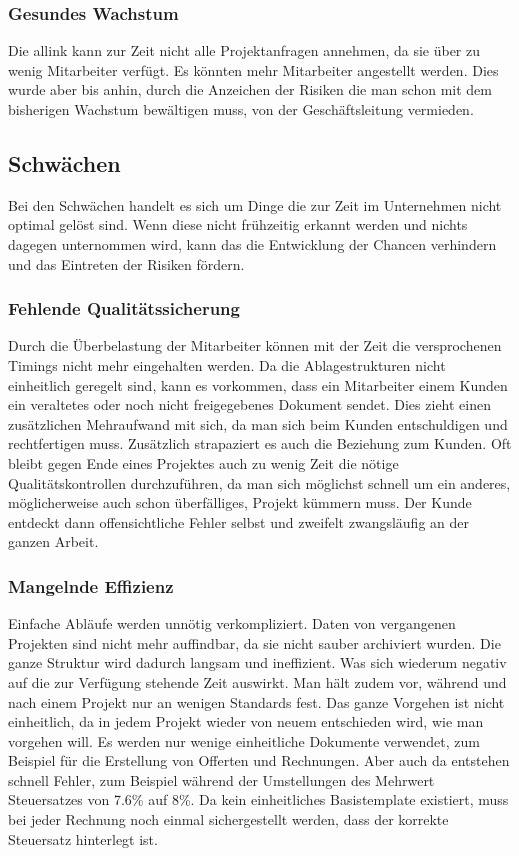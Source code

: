 \subsubsection{Gesundes Wachstum}
Die allink kann zur Zeit nicht alle Projektanfragen annehmen, da sie über zu
wenig Mitarbeiter verfügt. Es könnten mehr Mitarbeiter angestellt werden. Dies
wurde aber bis anhin, durch die Anzeichen der Risiken die man schon mit dem bisherigen
Wachstum bewältigen muss, von der Geschäftsleitung vermieden.

\subsection{Schwächen}
Bei den Schwächen handelt es sich um Dinge die zur Zeit im Unternehmen nicht
optimal gelöst sind. Wenn diese nicht frühzeitig erkannt werden und nichts
dagegen unternommen wird, kann das die Entwicklung der Chancen verhindern und
das Eintreten der Risiken fördern.

\subsubsection{Fehlende Qualitätssicherung}
Durch die Überbelastung der Mitarbeiter können mit der Zeit die versprochenen Timings
nicht mehr eingehalten werden. Da die Ablagestrukturen nicht einheitlich geregelt
sind, kann es vorkommen, dass ein Mitarbeiter einem Kunden ein veraltetes oder
noch nicht freigegebenes Dokument sendet. Dies zieht einen zusätzlichen 
Mehraufwand mit sich, da man sich beim Kunden entschuldigen und rechtfertigen
muss. Zusätzlich strapaziert es auch die Beziehung zum Kunden.
Oft bleibt gegen Ende eines Projektes auch zu wenig Zeit die nötige 
Qualitätskontrollen durchzuführen, da man sich möglichst schnell um ein anderes,
möglicherweise auch schon überfälliges, Projekt kümmern muss. Der Kunde entdeckt
dann offensichtliche Fehler selbst und zweifelt zwangsläufig an der ganzen Arbeit.

\subsubsection{Mangelnde Effizienz}
Einfache Abläufe werden unnötig verkompliziert. Daten von vergangenen Projekten 
sind nicht mehr auffindbar, da sie nicht sauber archiviert wurden. Die ganze
Struktur wird dadurch langsam und ineffizient. Was sich wiederum negativ auf die zur
Verfügung stehende Zeit auswirkt.
Man hält zudem vor, während und nach einem Projekt nur an wenigen Standards fest. 
Das ganze Vorgehen ist nicht einheitlich, da in jedem Projekt wieder von
neuem entschieden wird, wie man vorgehen will. Es werden nur wenige einheitliche
Dokumente verwendet, zum Beispiel für die Erstellung von Offerten und Rechnungen.
Aber auch da entstehen schnell Fehler, zum Beispiel während der Umstellungen des 
Mehrwert Steuersatzes von 7.6\% auf 8\%. Da kein einheitliches Basistemplate
existiert, muss bei jeder Rechnung noch einmal sichergestellt werden, dass
der korrekte Steuersatz hinterlegt ist.

